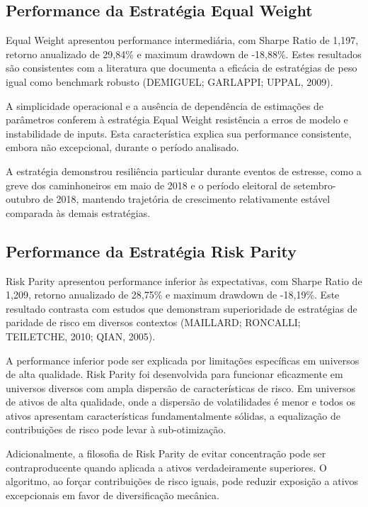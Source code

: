 \subsection{Performance da Estratégia Equal Weight}

Equal Weight apresentou performance intermediária, com Sharpe Ratio de 1,197, retorno anualizado de 29,84\% e maximum drawdown de -18,88\%. Estes resultados são consistentes com a literatura que documenta a eficácia de estratégias de peso igual como benchmark robusto (DEMIGUEL; GARLAPPI; UPPAL, 2009).

A simplicidade operacional e a ausência de dependência de estimações de parâmetros conferem à estratégia Equal Weight resistência a erros de modelo e instabilidade de inputs. Esta característica explica sua performance consistente, embora não excepcional, durante o período analisado.

A estratégia demonstrou resiliência particular durante eventos de estresse, como a greve dos caminhoneiros em maio de 2018 e o período eleitoral de setembro-outubro de 2018, mantendo trajetória de crescimento relativamente estável comparada às demais estratégias.

\subsection{Performance da Estratégia Risk Parity}

Risk Parity apresentou performance inferior às expectativas, com Sharpe Ratio de 1,209, retorno anualizado de 28,75\% e maximum drawdown de -18,19\%. Este resultado contrasta com estudos que demonstram superioridade de estratégias de paridade de risco em diversos contextos (MAILLARD; RONCALLI; TEILETCHE, 2010; QIAN, 2005).

A performance inferior pode ser explicada por limitações específicas em universos de alta qualidade. Risk Parity foi desenvolvida para funcionar eficazmente em universos diversos com ampla dispersão de características de risco. Em universos de ativos de alta qualidade, onde a dispersão de volatilidades é menor e todos os ativos apresentam características fundamentalmente sólidas, a equalização de contribuições de risco pode levar à sub-otimização.

Adicionalmente, a filosofia de Risk Parity de evitar concentração pode ser contraproducente quando aplicada a ativos verdadeiramente superiores. O algoritmo, ao forçar contribuições de risco iguais, pode reduzir exposição a ativos excepcionais em favor de diversificação mecânica.

